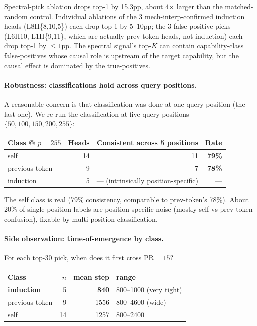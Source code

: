 \documentclass[11pt]{article}
\begin{document}
Spectral-pick ablation drops top-1 by 15.3pp, about 4$\times$ larger than the matched-random control. Individual ablations of the 3 mech-interp-confirmed induction heads (L8H\{8,10,5\}) each drop top-1 by 5--10pp; the 3 false-positive picks (L6H10, L1H\{9,11\}, which are actually prev-token heads, not induction) each drop top-1 by $\leq 1$pp. The spectral signal's top-$K$ can contain capability-class false-positives whose causal role is upstream of the target capability, but the causal effect is dominated by the true-positives.

\paragraph{Robustness: classifications hold across query positions.} A reasonable concern is that classification was done at one query position (the last one). We re-run the classification at five query positions $\{50, 100, 150, 200, 255\}$:

\begin{center}
\small
\begin{tabular}{lrrr}
\toprule
Class @ $p=255$ & Heads & Consistent across 5 positions & Rate \\
\midrule
self & 14 & 11 & \textbf{79\%} \\
previous-token & 9 & 7 & \textbf{78\%} \\
induction & 5 & --- (intrinsically position-specific) & --- \\
\bottomrule
\end{tabular}
\end{center}

The self class is real (79\% consistency, comparable to prev-token's 78\%). About 20\% of single-position labels are position-specific noise (mostly self-vs-prev-token confusion), fixable by multi-position classification.

\paragraph{Side observation: time-of-emergence by class.} For each top-30 pick, when does it first cross PR$=15$?

\begin{center}
\small
\begin{tabular}{lrrl}
\toprule
Class & $n$ & mean step & range \\
\midrule
\textbf{induction} & 5 & \textbf{840} & 800--1000 (very tight) \\
previous-token & 9 & 1556 & 800--4600 (wide) \\
self & 14 & 1257 & 800--2400 \\
\bottomrule
\end{tabular}
\end{center}
\end{document}
